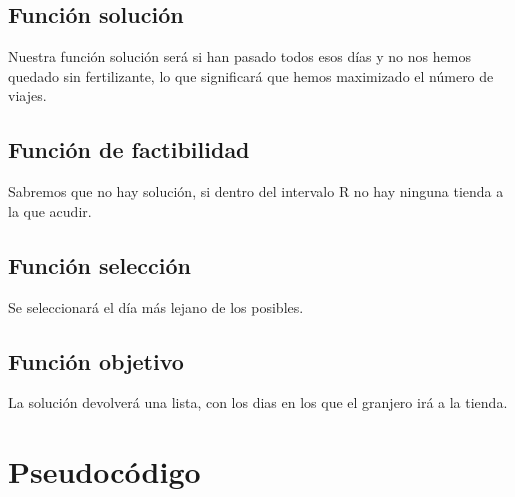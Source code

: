 \subsection{Función solución}
Nuestra función solución será si han pasado todos esos días y no nos hemos quedado sin fertilizante, lo que significará que hemos maximizado el número de viajes.

\subsection{Función de factibilidad}
Sabremos que no hay solución, si dentro del intervalo R no hay ninguna tienda a la que acudir.

\subsection{Función selección}
Se seleccionará el día más lejano de los posibles.

\subsection{Función objetivo}
La solución devolverá una lista, con los dias en los que el granjero irá a  la tienda.


\section{Pseudocódigo}




